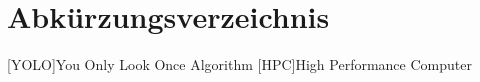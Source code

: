 \chapter{Abkürzungsverzeichnis} 
\begin{acronym}
    [YOLO]{You Only Look Once Algorithm}
    [HPC]{High Performance Computer}
\end{acronym}